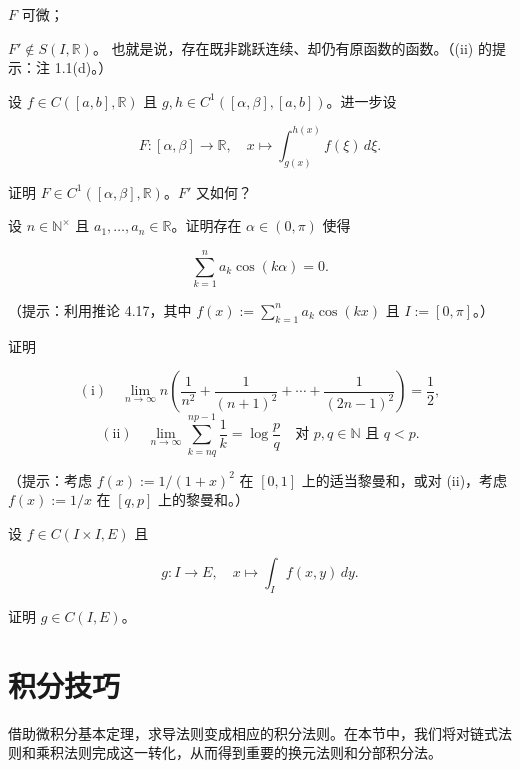 \begin{exercises}
\begin{subitems}
$ F $ 可微；

\item

$ F' \notin S(I, \mathbb{R}) $。
也就是说，存在既非跳跃连续、却仍有原函数的函数。（(ii) 的提示：注 1.1(d)。）

\end{subitems}

\item

设 $ f \in C([a, b], \mathbb{R}) $ 且 $ g, h \in C^1([\alpha, \beta], [a, b]) $。进一步设

\[
F : [\alpha, \beta] \to \mathbb{R} , \quad x \mapsto \int_{g(x)}^{h(x)} f(\xi) \, d\xi .
\]

证明 $ F \in C^1([\alpha, \beta], \mathbb{R}) $。$ F' $ 又如何？

\item

设 $ n \in \mathbb{N}^\times $ 且 $ a_1, \ldots, a_n \in \mathbb{R} $。证明存在 $ \alpha \in (0, \pi) $ 使得

\[
\sum_{k=1}^{n} a_k \cos(k\alpha) = 0 .
\]

（提示：利用推论 4.17，其中 $ f(x) := \sum_{k=1}^{n} a_k \cos(kx) $ 且 $ I := [0, \pi] $。）

\item

证明

\[
\mathrm{(i)}\quad \lim_{n \to \infty} n \left( \frac{1}{n^2} + \frac{1}{(n+1)^2} + \cdots + \frac{1}{(2n-1)^2} \right) = \frac{1}{2} ,
\]
\[
\mathrm{(ii)}\quad \lim_{n \to \infty} \sum_{k=nq}^{np-1} \frac{1}{k} = \log \frac{p}{q} \quad \text{对 } p, q \in \mathbb{N} \text{ 且 } q < p .
\]

（提示：考虑 $ f(x) := 1/(1+x)^2 $ 在 $ [0, 1] $ 上的适当黎曼和，或对 (ii)，考虑 $ f(x) := 1/x $ 在 $ [q, p] $ 上的黎曼和。）

\item

设 $ f \in C(I \times I, E) $ 且

\[
g : I \to E , \quad x \mapsto \int_I f(x, y) \, dy .
\]

证明 $ g \in C(I, E) $。

\end{exercises}

\section{积分技巧}

借助微积分基本定理，求导法则变成相应的积分法则。在本节中，我们将对链式法则和乘积法则完成这一转化，从而得到重要的换元法则和分部积分法。

